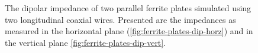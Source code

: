 \begin{figure}
\caption{The dipolar impedance of two parallel ferrite plates simulated using two longitudinal coaxial wires. Presented are the impedances as measured in the horizontal plane (\ref{fig:ferrite-plates-dip-horz}) and in the vertical plane \ref{fig:ferrite-plates-dip-vert}.}
\label{fig:ferrite-plates-dipolar}
\end{figure}


